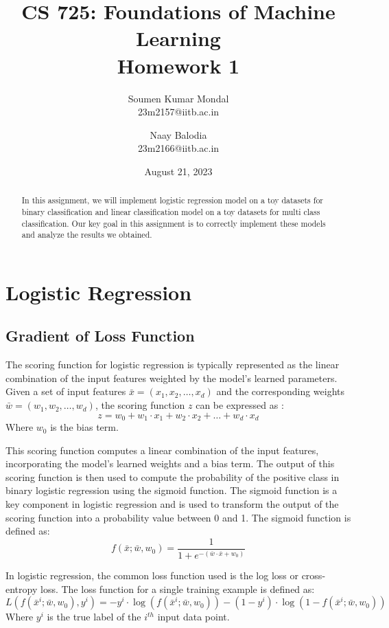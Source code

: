 \documentclass[12pt, a4paper, twoside]{article}
\title{\vspace{-0.5in}\textbf{CS 725: Foundations of Machine Learning \\
Homework 1}}
\author{Soumen Kumar Mondal\\
23m2157@iitb.ac.in \and
Naay Balodia\\
23m2166@iitb.ac.in}
\date{August  21, 2023}
\begin{document}
\maketitle
\thispagestyle{fancy}
\begin{abstract}
In this assignment, we will implement logistic regression model on a toy datasets for binary classification and linear classification model on a toy datasets for multi class classification. Our key goal in this assignment is to correctly implement these models and analyze the results we obtained.
\end{abstract}
		
\section{Logistic Regression}\label{S:LR}
\subsection{Gradient of Loss Function}\label{SS:lr-grad}
The scoring function for logistic regression is typically represented as the linear combination of the input features weighted by the model's learned parameters. Given a set of input features $\bar{x} = (x_1, x_2, \dots , x_d)$
and the corresponding weights $\bar{w} = (w_1, w_2, \dots , w_d)$, the scoring function $z$ can be expressed as \cite{ddl_book}:
\begin{equation}
	z = w_0 + w_1 \cdot x_1 + w_2 \cdot x_2 + \dots + w_d \cdot x_d
\end{equation}
Where $w_0$ is the bias term.

This scoring function computes a linear combination of the input features, incorporating the model's learned weights and a bias term. The output of this scoring function is then used to compute the probability of the positive class in binary logistic regression using the sigmoid function. The sigmoid function is a key component in logistic regression and is used to transform the output of the scoring function into a probability value between 0 and 1. The sigmoid function is defined as:
\begin{equation}\label{E:sigmoid}
	f(\bar{x}; \bar{w}, w_0) = \frac{1}{1 + e^{-(\bar{w} \cdot \bar{x} + w_0)}}
\end{equation}

In logistic regression, the common loss function used is the log loss or cross-entropy loss. The loss function for a single training example is defined as:
\begin{equation}\label{E:loss}
	L(f(\bar{x}^i; \bar{w}, w_0), y^i) = -y^i \cdot \log (f(\bar{x}^i; \bar{w}, w_0)) - (1-y^i) \cdot \log (1 - f(\bar{x}^i; \bar{w}, w_0))
\end{equation}
Where $y^i$ is the true label of the $i^{th}$ input data point.
\end{document}
